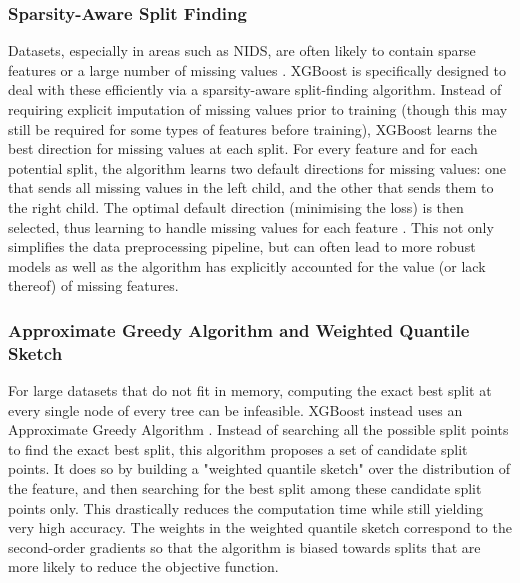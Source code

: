 \subsubsection{Sparsity-Aware Split Finding} 
Datasets, especially in areas such as NIDS, are often likely to contain sparse features or a large number of missing values \parencite{kumar2021cicids}. XGBoost is specifically designed to deal with these efficiently via a sparsity-aware split-finding algorithm. Instead of requiring explicit imputation of missing values prior to training (though this may still be required for some types of features before training), XGBoost learns the best direction for missing values at each split. For every feature and for each potential split, the algorithm learns two default directions for missing values: one that sends all missing values in the left child, and the other that sends them to the right child. The optimal default direction (minimising the loss) is then selected, thus learning to handle missing values for each feature \parencite{chen2016xgboost}. This not only simplifies the data preprocessing pipeline, but can often lead to more robust models as well as the algorithm has explicitly accounted for the value (or lack thereof) of missing features.

\subsubsection{Approximate Greedy Algorithm and Weighted Quantile Sketch} 
For large datasets that do not fit in memory, computing the exact best split at every single node of every tree can be infeasible. XGBoost instead uses an Approximate Greedy Algorithm \parencite{chen2016xgboost}. Instead of searching all the possible split points to find the exact best split, this algorithm proposes a set of candidate split points. It does so by building a "weighted quantile sketch" over the distribution of the feature, and then searching for the best split among these candidate split points only. This drastically reduces the computation time while still yielding very high accuracy. The weights in the weighted quantile sketch correspond to the second-order gradients so that the algorithm is biased towards splits that are more likely to reduce the objective function.

